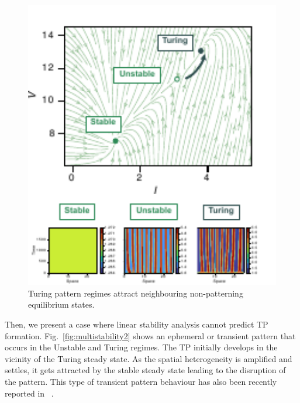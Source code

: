 \begin{figure}[H] %
    \centering
    \begin{adjustbox}{center}
        \includegraphics[width=1\textwidth]{chapters/Chapter 1/multistability1} %
    \end{adjustbox}
    \caption{Turing pattern regimes attract neighbouring non-patterning equilibrium states.}
    \label{fig:multistability1} %
\end{figure}

Then, we present a case where linear stability analysis cannot predict TP formation. Fig.~\ref{fig:multistability2} shows an ephemeral or transient pattern that occurs in the Unstable and Turing regimes.
The TP initially develops in the vicinity of the Turing steady state.
As the spatial heterogeneity is amplified and settles, it gets attracted by the stable steady state leading to the disruption of the pattern.
This type of transient pattern behaviour has also been recently reported in ~\cite{Krause2023}.

